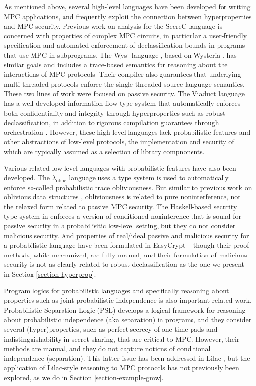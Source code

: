 As mentioned above, several high-level languages have been developed
for writing MPC applications, 
and frequently exploit the connection between hyperproperties and MPC
security. Previous work on analysis for the SecreC language
\cite{almeida2018enforcing,10.1145/2637113.2637119} is concerned with
properties of complex MPC circuits, in particular a user-friendly
specification and automated enforcement of declassification bounds in
programs that use MPC in subprograms. The Wys$^\star$ language
\cite{wysstar}, based on Wysteria \cite{rastogi2014wysteria}, has
similar goals and includes a trace-based semantics for reasoning about
the interactions of MPC protocols. Their compiler also guarantees that
underlying multi-threaded protocols enforce the single-threaded source
language semantics. These two lines of work were focused on passive
security. The Viaduct language \cite{XXX} has a well-developed
information flow type system that automatically enforces both
confidentiality and integrity through hyperproperties such as robust
declassification, in addition to rigorous compilation guarantees
through orchestration \cite{XXX}. However, these high level
languages lack probabilistic features and other abstractions of
low-level protocols, the implementation and security of which
are typically assumed as a selection of library compnonents. 

Various related low-level languages with probabilistic features have
also been developed. The $\lambda_{\mathrm{obliv}}$ language
\cite{darais2019language} uses a type system is used to automatically
enforce so-called probabilistic trace obliviousness.  But similar to
previous work on oblivious data structures \cite{10.1145/3498713},
obliviousness is related to pure noninterference, not the relaxed form
related to passive MPC security. The Haskell-based security type system in
\cite{XXX} enforces a version of conditioned noninterence that is
sound for passive security in a probabilisitic low-level setting, but
they do not consider malicious security. And properties of real/ideal
passive and malicious security for a probabilistic language have been
formulated in EasyCrypt \cite{8429300}-- though their proof methods,
while mechanized, are fully manual, and their formulation of malicious
security is not as clearly related to robust declassification as the
one we present in Section \ref{section-hyperprop}. 

Program logics for probabilistic languages and specifically reasoning
about properties such as joint probabilistic independence is also
important related work. Probabilistic Separation Logic (PSL)
\cite{barthe2019probabilistic} develops a logical framework for
reasoning about probabilistic independence (aka separation) in
programs, and they consider several (hyper)properties, such as perfect
secrecy of one-time-pads and indistinguishability in secret sharing,
that are critical to MPC. However, their methods are manual, and they
do not capture notions of conditional independence (separation). This
latter issue has been addressed in Lilac \cite{XXX}, but the
application of Lilac-style reasoning to MPC protocols has not
previously been explored, as we do in Section
\ref{section-example-gmw}.

